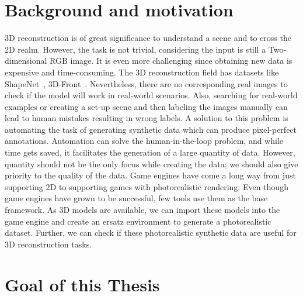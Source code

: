 \section{Background and motivation}\label{sec:Background and motivation}

3D reconstruction is of great significance to understand a scene and to cross the 2D realm.
However, the task is not trivial, considering the input is still a Two-dimensional RGB image.
It is even more challenging since obtaining new data is expensive and time-consuming.
The 3D reconstruction field has datasets like ShapeNet~\cite{chang2015shapenet}, 3D-Front~\cite{Fu20203DFRONT3F}.
Nevertheless, there are no corresponding real images to check if the model will work in real-world scenarios.
Also, searching for real-world examples or creating a set-up scene and then labeling the images manually can lead to human mistakes resulting in wrong labels.
A solution to this problem is automating the task of generating synthetic data which can produce pixel-perfect annotations.
Automation can solve the human-in-the-loop problem, and while time gets saved, it facilitates the generation of a large quantity of data.
However, quantity should not be the only focus while creating the data;
we should also give priority to the quality of the data.
Game engines have come a long way from just supporting 2D to supporting games with photorealistic rendering.
Even though game engines have grown to be successful, few tools use them as the base framework.
As 3D models are available, we can import these models into the game engine and create an ersatz environment to generate a photorealistic dataset.
Further, we can check if these photorealistic synthetic data are useful for 3D reconstruction tasks.

\section{Goal of this Thesis}\label{sec:goal}

